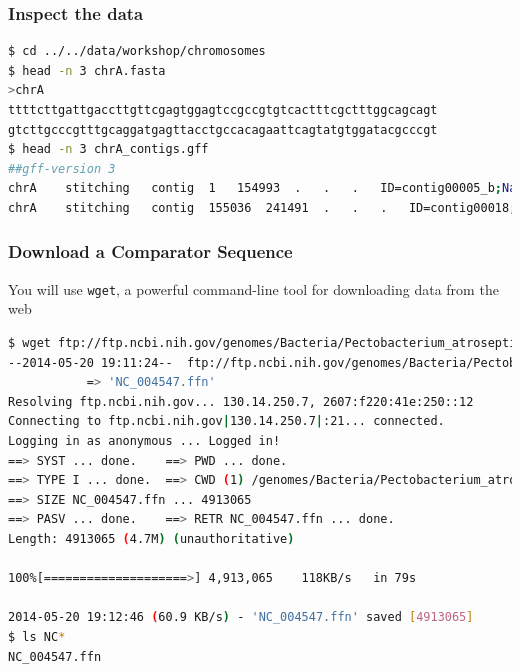 \documentclass[table]{beamer}
\begin{document}
  \begin{frame}[fragile]
    \frametitle{Inspect the data}
    \begin{lstlisting}[language=bash]
$ cd ../../data/workshop/chromosomes
$ head -n 3 chrA.fasta 
>chrA
ttttcttgattgaccttgttcgagtggagtccgccgtgtcactttcgctttggcagcagt
gtcttgcccgtttgcaggatgagttacctgccacagaattcagtatgtggatacgcccgt
$ head -n 3 chrA_contigs.gff 
##gff-version 3
chrA	stitching	contig	1	154993	.	.	.	ID=contig00005_b;Name=contig00005_b
chrA	stitching	contig	155036	241491	.	.	.	ID=contig00018;Name=contig00018
    \end{lstlisting}
\end{frame}  

  \begin{frame}[fragile]
    \frametitle{Download a Comparator Sequence}
    You will use \texttt{wget}, a powerful command-line tool for downloading data from the web
    \begin{lstlisting}[language=bash]
$ wget ftp://ftp.ncbi.nih.gov/genomes/Bacteria/Pectobacterium_atrosepticum_SCRI1043_uid57957/NC_004547.ffn
--2014-05-20 19:11:24--  ftp://ftp.ncbi.nih.gov/genomes/Bacteria/Pectobacterium_atrosepticum_SCRI1043_uid57957/NC_004547.ffn
           => 'NC_004547.ffn'
Resolving ftp.ncbi.nih.gov... 130.14.250.7, 2607:f220:41e:250::12
Connecting to ftp.ncbi.nih.gov|130.14.250.7|:21... connected.
Logging in as anonymous ... Logged in!
==> SYST ... done.    ==> PWD ... done.
==> TYPE I ... done.  ==> CWD (1) /genomes/Bacteria/Pectobacterium_atrosepticum_SCRI1043_uid57957 ... done.
==> SIZE NC_004547.ffn ... 4913065
==> PASV ... done.    ==> RETR NC_004547.ffn ... done.
Length: 4913065 (4.7M) (unauthoritative)

100%[====================>] 4,913,065    118KB/s   in 79s    

2014-05-20 19:12:46 (60.9 KB/s) - 'NC_004547.ffn' saved [4913065]
$ ls NC*
NC_004547.ffn
    \end{lstlisting}
\end{frame}  


\end{document}
